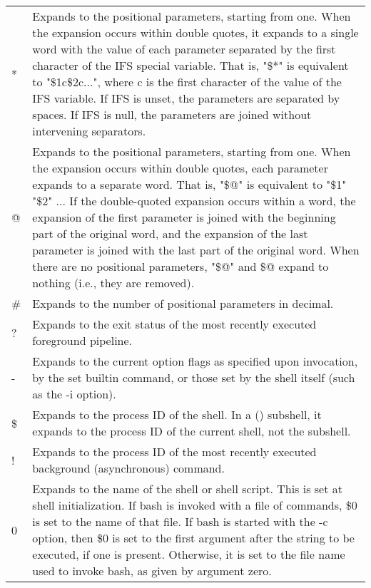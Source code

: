 \begin{longtable}{p{}p{}}

* &
Expands to the positional parameters, starting from one. When the expansion occurs within double quotes, it expands to a single word with the value of each parameter separated by the first character of the IFS special variable. That is, "\$*" is equivalent to "\$1c\$2c...", where c is the first character of the value of the IFS variable. If IFS is unset, the parameters are separated by spaces. If IFS is null, the parameters are joined without intervening separators. \\

@ &

Expands to the positional parameters, starting from one. When the expansion occurs within double quotes, each parameter expands to a separate word. That is, "\$@" is equivalent to "\$1" "\$2" ... If the double-quoted expansion occurs within a word, the expansion of the first parameter is joined with the beginning part of the original word, and the expansion of the last parameter is joined with the last part of the original word. When there are no positional parameters, "\$@" and \$@ expand to nothing (i.e., they are removed). \\

\# &

Expands to the number of positional parameters in decimal. \\

? &

Expands to the exit status of the most recently executed foreground pipeline. \\

- &

Expands to the current option flags as specified upon invocation, by the set builtin command, or those set by the shell itself (such as the -i option). \\

\$ &

Expands to the process ID of the shell. In a () subshell, it expands to the process ID of the current shell, not the subshell. \\

! &

Expands to the process ID of the most recently executed background (asynchronous) command. \\

0 &

Expands to the name of the shell or shell script. This is set at shell initialization. If bash is invoked with a file of commands, \$0 is set to the name of that file. If bash is started with the -c option, then \$0 is set to the first argument after the string to be executed, if one is present. Otherwise, it is set to the file name used to invoke bash, as given by argument zero. \\


\end{longtable}
